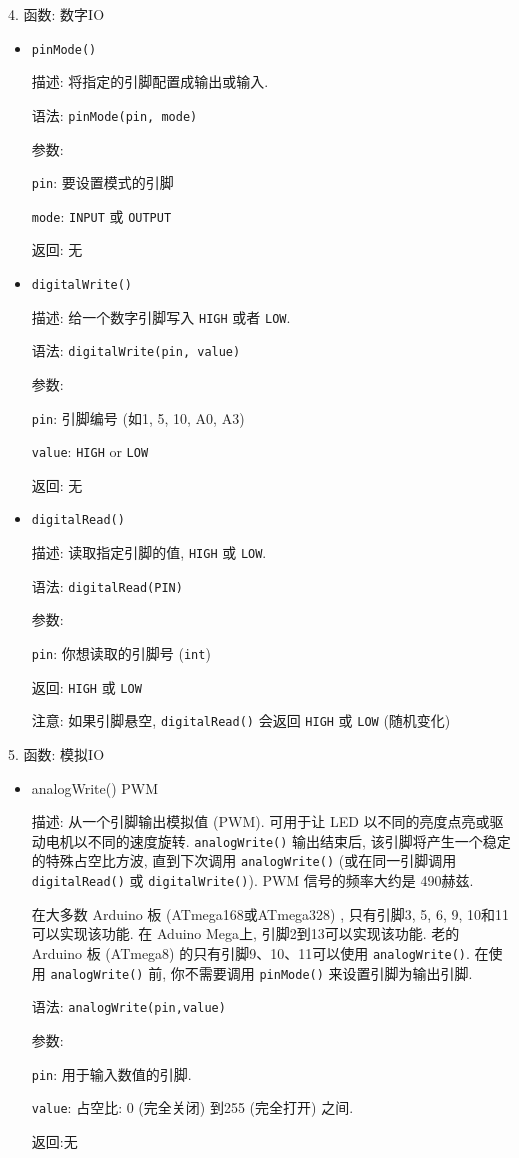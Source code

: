 \documentclass[openany, fontset=windowsold]{ctexbook}
\theoremstyle{kaiti}
\theoremstyle{normal}
\begin{document}
4. 函数: 数字IO

\begin{itemize}
  \item \verb|pinMode()|

  描述: 将指定的引脚配置成输出或输入.

  语法: \verb|pinMode(pin, mode)|

  参数:

  \verb|pin|: 要设置模式的引脚

  \verb|mode|: \verb|INPUT| 或 \verb|OUTPUT|

  返回: 无

  \item \verb|digitalWrite()|

  描述: 给一个数字引脚写入 \verb|HIGH| 或者 \verb|LOW|.

  语法: \verb|digitalWrite(pin, value)|

  参数:

  \verb|pin|: 引脚编号 (如1, 5, 10, A0, A3) 

  \verb|value|: \verb|HIGH| or \verb|LOW|

  返回: 无

  \item \verb|digitalRead()|

  描述: 读取指定引脚的值, \verb|HIGH| 或 \verb|LOW|.

  语法: \verb|digitalRead(PIN)|

  参数:

  \verb|pin|: 你想读取的引脚号 (\verb|int|) 

  返回: \verb|HIGH| 或 \verb|LOW|

  注意: 如果引脚悬空, \verb|digitalRead()| 会返回 \verb|HIGH| 或 \verb|LOW|  (随机变化) 
\end{itemize}

5. 函数: 模拟IO

\begin{itemize}
  \item analogWrite() PWM

  描述: 从一个引脚输出模拟值 (PWM). 可用于让 LED 以不同的亮度点亮或驱动电机以不同的速度旋转. \verb|analogWrite()| 输出结束后, 该引脚将产生一个稳定的特殊占空比方波, 直到下次调用 \verb|analogWrite()|  (或在同一引脚调用 \verb|digitalRead()| 或 \verb|digitalWrite()|). PWM 信号的频率大约是 490赫兹.

  在大多数 Arduino 板 (ATmega168或ATmega328) , 只有引脚3, 5, 6, 9, 10和11可以实现该功能. 在 Aduino Mega上, 引脚2到13可以实现该功能. 老的 Arduino 板 (ATmega8) 的只有引脚9、10、11可以使用 \verb|analogWrite()|. 在使用 \verb|analogWrite()| 前, 你不需要调用 \verb|pinMode()| 来设置引脚为输出引脚.

  语法: \verb|analogWrite(pin,value)|

  参数:

  \verb|pin|: 用于输入数值的引脚.

  \verb|value|: 占空比: 0 (完全关闭) 到255 (完全打开) 之间.

  返回:无
\end{itemize}
\end{document}
